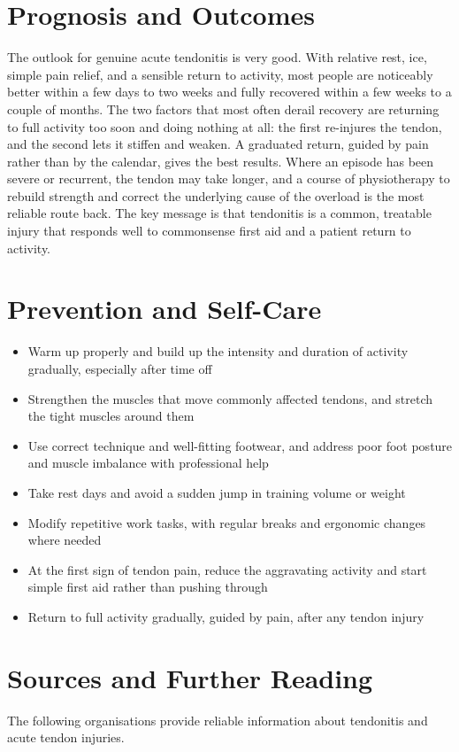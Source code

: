 \section*{Prognosis and Outcomes}
The outlook for genuine acute tendonitis is very good. With relative rest, ice, simple pain relief, and a sensible return to activity, most people are noticeably better within a few days to two weeks and fully recovered within a few weeks to a couple of months. The two factors that most often derail recovery are returning to full activity too soon and doing nothing at all: the first re-injures the tendon, and the second lets it stiffen and weaken. A graduated return, guided by pain rather than by the calendar, gives the best results. Where an episode has been severe or recurrent, the tendon may take longer, and a course of physiotherapy to rebuild strength and correct the underlying cause of the overload is the most reliable route back. The key message is that tendonitis is a common, treatable injury that responds well to commonsense first aid and a patient return to activity.

\section*{Prevention and Self-Care}
\begin{itemize}
    \item Warm up properly and build up the intensity and duration of activity gradually, especially after time off
    \item Strengthen the muscles that move commonly affected tendons, and stretch the tight muscles around them
    \item Use correct technique and well-fitting footwear, and address poor foot posture and muscle imbalance with professional help
    \item Take rest days and avoid a sudden jump in training volume or weight
    \item Modify repetitive work tasks, with regular breaks and ergonomic changes where needed
    \item At the first sign of tendon pain, reduce the aggravating activity and start simple first aid rather than pushing through
    \item Return to full activity gradually, guided by pain, after any tendon injury
\end{itemize}

\section*{Sources and Further Reading}
The following organisations provide reliable information about tendonitis and acute tendon injuries.

